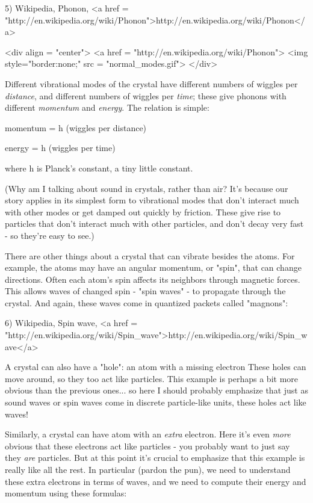 5) Wikipedia, Phonon, <a href = "http://en.wikipedia.org/wiki/Phonon">http://en.wikipedia.org/wiki/Phonon</a>

<div align = "center">
<a href = "http://en.wikipedia.org/wiki/Phonon">
<img style="border:none;" src = "normal_modes.gif">
</div>

Different vibrational modes of the crystal have different numbers of
wiggles per \emph{distance}, and different numbers of wiggles per
\emph{time}; these give phonons with different \emph{momentum} and
\emph{energy}.  The relation is simple:

momentum = h (wiggles per distance)

energy = h (wiggles per time)

where h is Planck's constant, a tiny little constant. 

(Why am I talking about sound in crystals, rather than air?   It's
because our story applies in its simplest form to vibrational 
modes that don't interact much with other modes or get damped out
quickly by friction.  These give rise to particles that don't 
interact much with other particles, and don't decay very fast -
so they're easy to see.) 

There are other things about a crystal that can vibrate besides
the atoms.  For example, the atoms may have an angular momentum,
or "spin", that can change directions.  Often each atom's spin
affects its neighbors through magnetic forces.  This allows waves
of changed spin - "spin waves" - to propagate through the crystal.  
And again, these waves come in quantized packets called "magnons":

6) Wikipedia, Spin wave, <a href = "http://en.wikipedia.org/wiki/Spin_wave">http://en.wikipedia.org/wiki/Spin_wave</a>

A crystal can also have a "hole": an atom with a missing
electron These holes can move around, so they too act like particles.
This example is perhaps a bit more obvious than the previous ones...
so here I should probably emphasize that just as sound waves or spin
waves come in discrete particle-like units, these holes act like
waves!

Similarly, a crystal can have atom with an \emph{extra} electron.  
Here it's even \emph{more} obvious that these electrons act like 
particles - you probably want to just say they \emph{are} particles.
But at this point it's crucial to emphasize that this example
is really like all the rest.  In particular (pardon the pun),
we need to understand these extra electrons in terms of waves,
and we need to compute their energy and momentum using these
formulas:

